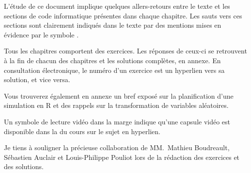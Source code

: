 L'étude de ce document implique quelques allers-retours entre le texte
et les sections de code informatique présentes dans chaque chapitre.
Les sauts vers ces sections sont clairement indiqués dans le texte par
des mentions mises en évidence par le symbole {\faMapSigns}.

Tous les chapitres comportent des exercices. Les réponses de ceux-ci se
retrouvent à la fin de chacun des chapitres et les solutions complètes,
en annexe. En consultation électronique, le numéro d'un exercice est
un hyperlien vers sa solution, et vice versa.

Vous trouverez également en annexe un bref exposé sur la planification
d'une simulation en R et des rappels sur la transformation de
variables aléatoires.

Un symbole de lecture vidéo dans la marge indique qu'une capsule vidéo
est disponible dans la %
du cours sur le sujet en hyperlien.

Je tiens à souligner la précieuse collaboration de MM.~Mathieu
Boudreault, Sébastien Auclair et Louis-Philippe Pouliot lors de la
rédaction des exercices et des solutions.


